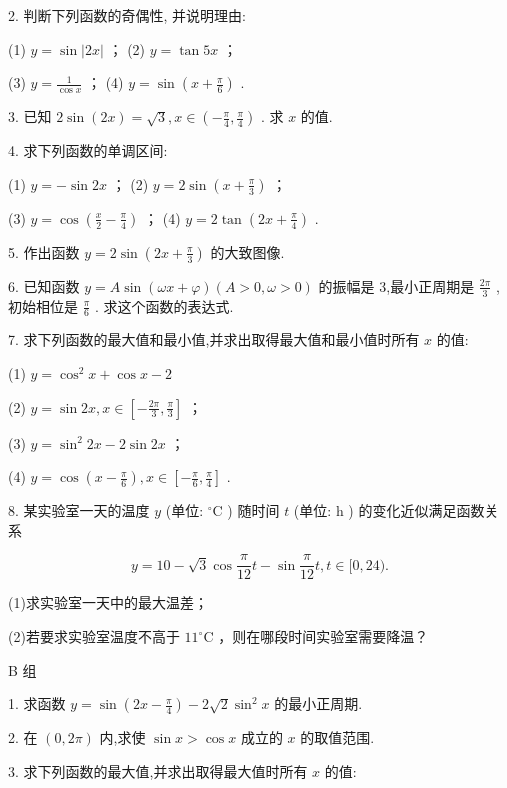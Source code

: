 \documentclass[10pt]{article}
\begin{document}
2. 判断下列函数的奇偶性, 并说明理由:

(1) \(y = \sin \left| {2x}\right|\) ； (2) \(y = \tan {5x}\) ；

(3) \(y = \frac{1}{\cos x}\) ； (4) \(y = \sin \left( {x + \frac{\pi }{6}}\right)\) .

3. 已知 \(2\sin \left( {2x}\right)  = \sqrt{3},x \in  \left( {-\frac{\pi }{4},\frac{\pi }{4}}\right)\) . 求 \(x\) 的值.

4. 求下列函数的单调区间:

(1) \(y =  - \sin {2x}\) ； (2) \(y = 2\sin \left( {x + \frac{\pi }{3}}\right)\) ；

(3) \(y = \cos \left( {\frac{x}{2} - \frac{\pi }{4}}\right)\) ； (4) \(y = 2\tan \left( {{2x} + \frac{\pi }{4}}\right)\) .

5. 作出函数 \(y = 2\sin \left( {{2x} + \frac{\pi }{3}}\right)\) 的大致图像.

6. 已知函数 \(y = A\sin \left( {{\omega x} + \varphi }\right) \left( {A > 0,\omega  > 0}\right)\) 的振幅是 3,最小正周期是 \(\frac{2\pi }{3}\) ,初始相位是 \(\frac{\pi }{6}\) . 求这个函数的表达式.

7. 求下列函数的最大值和最小值,并求出取得最大值和最小值时所有 \(x\) 的值:

(1) \(y = {\cos }^{2}x + \cos x - 2\)

(2) \(y = \sin {2x},x \in  \left\lbrack  {-\frac{2\pi }{3},\frac{\pi }{3}}\right\rbrack\) ；

(3) \(y = {\sin }^{2}{2x} - 2\sin {2x}\) ；

(4) \(y = \cos \left( {x - \frac{\pi }{6}}\right) ,x \in  \left\lbrack  {-\frac{\pi }{6},\frac{\pi }{4}}\right\rbrack\) .

8. 某实验室一天的温度 \(y\) (单位: \({}^{ \circ  }\mathrm{C}\) ) 随时间 \(t\) (单位: \(\mathrm{h}\) ) 的变化近似满足函数关系

\[
y = {10} - \sqrt{3}\cos \frac{\pi }{12}t - \sin \frac{\pi }{12}t,t \in  \lbrack 0,{24}).
\]

(1)求实验室一天中的最大温差；

(2)若要求实验室温度不高于 \({11}^{ \circ  }\mathrm{C}\) ，则在哪段时间实验室需要降温？

B 组

1. 求函数 \(y = \sin \left( {{2x} - \frac{\pi }{4}}\right)  - 2\sqrt{2}{\sin }^{2}x\) 的最小正周期.

2. 在 \(\left( {0,{2\pi }}\right)\) 内,求使 \(\sin x > \cos x\) 成立的 \(x\) 的取值范围.

3. 求下列函数的最大值,并求出取得最大值时所有 \(x\) 的值:
\end{document}

